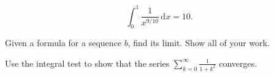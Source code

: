 \documentclass[12pt,fleqn]{exam}
\begin{document}
\begin{questions}
\begin{solution}[2.0in]
  \begin{equation*}
    \int_0^1 \frac{1}{x^{9/10}} \, \mathrm{d} x = 10.
  \end{equation*}
\end{solution}

   \question Given a formula for a sequence $b$, find its limit.
   Show all of your work.

    




  

  

  \newpage
  
  
  
\question Use the integral test to show that the series $\sum_{k=0}^\infty \frac{1}{1+k^2} $ converges.
\end{questions}
\end{document}
